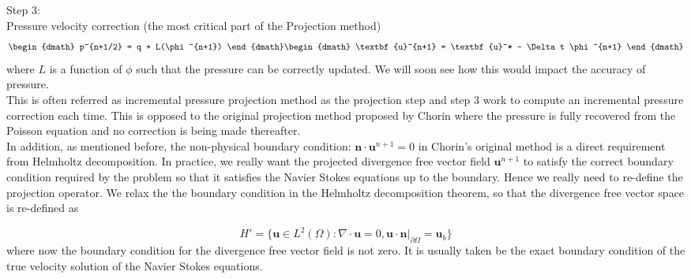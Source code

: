 Step 3:\\
Pressure velocity correction (the most critical part of the Projection method)
\begin{dgroup}
\begin{dmath}
p^{n+1/2} = q + L(\phi^{n+1})
\end{dmath}
\begin{dmath}
\textbf{u}^{n+1} = \textbf{u}^* - \Delta t \phi^{n+1}
\end{dmath}
\end{dgroup}
where $\textit{L}$ is a function of $\phi$ such that the pressure can be correctly updated. We will soon see how this would impact the accuracy of pressure.\\


This is often referred as incremental pressure projection method \cite{brown2001accurate} as the projection step and step 3 work to compute an incremental pressure correction each time. This is opposed to the original projection method proposed by Chorin where the pressure is fully recovered from the Poisson equation and no correction is being made thereafter.\\

In addition, as mentioned before, the non-physical boundary condition: $\textbf{n}\cdot\textbf{u}^{n+1} = 0$ in Chorin's original method is a direct requirement from Helmholtz decomposition. In practice, we really want the projected divergence free vector field $\textbf{u}^{n+1}$ to satisfy the correct boundary condition required by the problem so that it satisfies the Navier Stokes equations up to the boundary. Hence we really need to re-define the projection operator. We relax the the boundary condition in the Helmholtz decomposition theorem, so that the divergence free vector space is re-defined as 
\begin{mydef}
\begin{equation}\label{eq:set H' set of square integrable divergence free and relaxed boundary}
H' = \lbrace {\textbf{u} \in \textit{L}^2 (\Omega): \nabla \cdot \textbf{u} = 0, \textbf{u} \cdot \textbf{n} |_{\partial \Omega} = \textbf{u}_b} \rbrace 
\end{equation}
where now the boundary condition for the divergence free vector field is not zero. It is usually taken be the exact boundary condition of the true velocity solution of the Navier Stokes equations.\\
\end{mydef}

